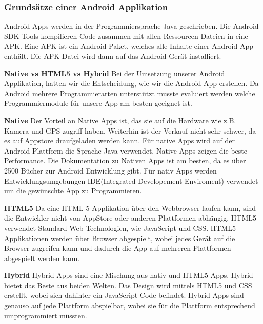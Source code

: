 
\subsubsection{Grundsätze einer Android Applikation}
\label{subsec:aapp-fundam}

Android Apps werden in der Programmiersprache Java geschrieben.
Die Android SDK-Tools kompilieren Code zusammen mit allen Ressourcen-Dateien in eine APK.
Eine APK ist ein Android-Paket, welches alle Inhalte einer Android App enthält. 
Die APK-Datei wird dann auf das Android-Gerät installiert. 


\textbf{Native vs HTML5 vs Hybrid} \newline
Bei der Umsetzung unserer Android Applikation, hatten wir die Entscheidung, wie wir die Android App erstellen. 
Da Android mehrere Programmierarten unterstützt musste evaluiert werden welche Programmiermodule für unsere App am besten geeignet ist. \nextline

\textbf{Native\newline} 
Der Vorteil an Native Apps ist, das sie auf die Hardware wie z.B. Kamera und GPS zugriff haben. 
Weiterhin ist der Verkauf nicht sehr schwer, da es auf Appstore draufgeladen werden kann. 
Für native Apps wird auf der Android-Plattform die Sprache Java verwendet.
Native Apps zeigen die beste Performance.
Die Dokumentation zu Nativen Apps ist am besten, da es über 2500 Bücher zur Android Entwicklung gibt.
Für nativ Apps werden Entwicklungsumgebungen-IDE(Integrated Developement Enviroment) verwendet um die gewünschte App zu Programmieren.\nextline


\textbf{HTML5\newline} 
Da eine HTML 5 Applikation über den Webbrowser laufen kann, sind die Entwickler nicht von AppStore oder anderen Plattformen abhängig. 
HTML5 verwendet Standard Web Technologien, wie JavaScript und CSS.
HTML5 Applikationen werden über Browser abgespielt, wobei jedes Gerät auf die Browser zugreifen kann und dadurch die App auf mehreren Plattformen abgespielt werden kann. \nextline

\textbf{Hybrid\newline} 
Hybrid Apps sind eine Mischung aus nativ und HTML5 Apps. Hybrid bietet das Beste aus beiden Welten. Das Design wird mittels HTML5 und CSS erstellt, wobei sich dahinter ein JavaScript-Code befindet. Hybrid Apps sind genauso auf jede Plattform abspielbar, wobei sie für die Plattform entsprechend umprogrammiert müssten.    
\nextline

